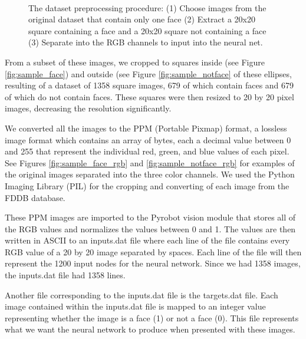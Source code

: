 \documentclass[11pt]{article}
\begin{document}
\begin{figure}[H]
\begin{center}
{        }%
        \\%
    \end{center}
    \caption{%
        The dataset preprocessing procedure: (1) Choose images from the original dataset that contain only one face (2) Extract a 20x20 square containing a face and a 20x20 square not containing a face (3) Separate into the RGB channels to input into the neural net.
     }\label{fig:notface}%
\end{figure}


From a subset of these images, we cropped to squares inside (see Figure \ref{fig:sample_face}) and outside (see Figure \ref{fig:sample_notface} of these ellipses, resulting of a dataset of 1358 square images, 679 of which contain faces and 679 of which do not contain faces. These squares were then resized to 20 by 20 pixel images, decreasing the resolution significantly.


We converted all the images to the PPM (Portable Pixmap) format, a lossless image format which contains an array of bytes, each a decimal value between 0 and 255 that represent the individual red, green, and blue values of each pixel. See Figures \ref{fig:sample_face_rgb} and \ref{fig:sample_notface_rgb} for examples of the original images separated into the three color channels. We used the Python Imaging Library (PIL) for the cropping and converting of each image from the FDDB database.

These PPM images are imported to the Pyrobot vision module that stores all of the RGB values and normalizes the values between 0 and 1. The values are then written in ASCII to an inputs.dat file where each line of the file contains every RGB value of a 20 by 20 image separated by spaces. Each line of the file will then represent the 1200 input nodes for the neural network. Since we had 1358 images, the inputs.dat file had 1358 lines.

Another file corresponding to the inputs.dat file is the targets.dat file. Each image contained within the inputs.dat file is mapped to an integer value representing whether the image is a face (1) or not a face (0). This file represents what we want the neural network to produce when presented with these images.
\end{document}

